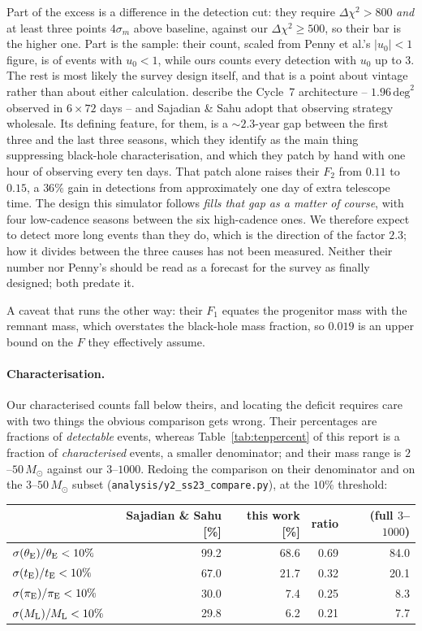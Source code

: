 \documentclass[english,10pt,a4paper]{article}
\newcommand{\tE}{t_{\rm E}}
\newcommand{\piE}{\pi_{\rm E}}
\newcommand{\tetE}{\theta_{\rm E}}
\newcommand{\Ml}{M_{\rm L}}
\newcommand{\Msun}{M_\odot}
\begin{document}
Part of the excess is a difference in the detection cut: they require
$\Delta\chi^2 > 800$ \emph{and} at least three points $4\sigma_m$ above baseline, against our
$\Delta\chi^2 \ge 500$, so their bar is the higher one. Part is the sample: their count, scaled
from Penny et al.'s $|u_0|<1$ figure, is of events with $u_0<1$, while ours counts every detection
with $u_0$ up to $3$. The rest is most likely the survey design
itself, and that is a point about vintage rather than about either calculation. \citet{Penny2019} describe the Cycle~7 architecture --
$1.96\,\mathrm{deg}^2$ observed in $6\times72$ days -- and Sajadian \& Sahu adopt that observing
strategy wholesale. Its defining feature, for them, is a $\sim\!2.3$-year gap between the first
three and the last three seasons, which they identify as the main thing suppressing black-hole
characterisation, and which they patch by hand with one hour of observing every ten days. That
patch alone raises their $F_2$ from $0.11$ to $0.15$, a $36\%$ gain in detections from
approximately one day of extra telescope time. The design this simulator follows \citep{ROTAC2025}
\emph{fills that gap as a matter of course}, with four low-cadence seasons between the six
high-cadence ones. We therefore expect to detect more long events than they do, which is the
direction of the factor $2.3$; how it divides between the three causes has not been measured. Neither their number nor Penny's should be read as a forecast for the
survey as finally designed; both predate it.

A caveat that runs the other way: their $F_1$ equates the progenitor mass with the remnant mass,
which overstates the black-hole mass fraction, so $0.019$ is an upper bound on the $F$ they
effectively assume.

\paragraph{Characterisation.} Our characterised counts fall below theirs, and locating the
deficit requires care with two things the obvious comparison gets wrong. Their percentages are
fractions of \emph{detectable} events, whereas Table~\ref{tab:tenpercent} of this report is a
fraction of \emph{characterised} events, a smaller denominator; and their mass range is
$2$--$50\,\Msun$ against our $3$--$1000$. Redoing the comparison on their denominator and on the
$3$--$50\,\Msun$ subset (\texttt{analysis/y2\_ss23\_compare.py}), at the $10\%$ threshold:

\begin{center}
\begin{tabular}{lrrrr}
\toprule
 & Sajadian \& Sahu [\%] & this work [\%] & ratio & (full $3$--$1000$) \\
\midrule
$\sigma(\tetE)/\tetE < 10\%$ & 99.2 & 68.6 & 0.69 & 84.0 \\
$\sigma(\tE)/\tE < 10\%$     & 67.0 & 21.7 & 0.32 & 20.1 \\
$\sigma(\piE)/\piE < 10\%$   & 30.0 &  7.4 & 0.25 &  8.3 \\
$\sigma(\Ml)/\Ml < 10\%$     & 29.8 &  6.2 & 0.21 &  7.7 \\
\bottomrule
\end{tabular}
\end{center}
\end{document}

